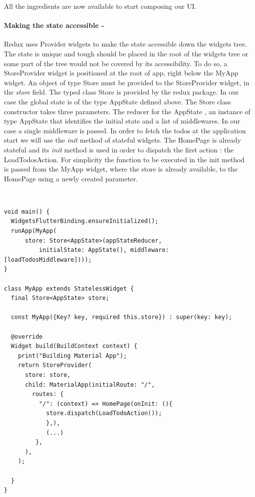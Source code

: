 All the ingredients are now available to start composing our UI.

\paragraph{Making the state accessible - }
\label{subpar:todo_app_bloc_core_state}
Redux uses Provider widgets to make the state accessible down the widgets tree. The state is unique and tough should  be placed in the root of the widgets tree or some part of the tree would not be covered by its accessibility. To do so, a StoreProvider widget is positioned at the root of app, right below the MyApp widget. An object of type Store must be provided to the StoreProvider widget, in the \textit{store }field. The typed class Store is provided by the redux package. In our case the global state is of the type AppState defined above. The Store class constructor takes three parameters. The reducer for the AppState , an instance of type AppState that identifies the initial state and a list of middlewares. In our case a single middleware is passed. In order to fetch the todos at the application start we will use the \textit{init} method of stateful widgets.  The HomePage is already stateful and its \textit{init} method is used in order to dispatch the first action : the LoadTodosAction. For simplicity the function to be executed in the init method is passed from the MyApp widget, where the store is already available, to the HomePage using a newly created parameter.
\begin{code}
\mbox{}\\
 \mbox{}
		\label{code:2.14}
\begin{verbatim}
void main() {
  WidgetsFlutterBinding.ensureInitialized();
  runApp(MyApp(
      store: Store<AppState>(appStateReducer,
          initialState: AppState(), middleware: [loadTodosMiddleware])));
}

class MyApp extends StatelessWidget {
  final Store<AppState> store;

  const MyApp({Key? key, required this.store}) : super(key: key);

  @override
  Widget build(BuildContext context) {
    print("Building Material App");
    return StoreProvider(
      store: store,
      child: MaterialApp(initialRoute: "/",
        routes: {
          "/": (context) => HomePage(onInit: (){
            store.dispatch(LoadTodoAction());
            },),
            (...)
         },
      ),
    );

  }
}
\end{verbatim}
\mbox{}
\end{code}

